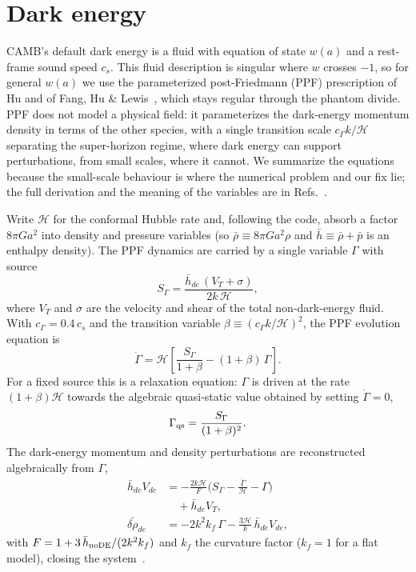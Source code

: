 \documentclass[prd, twocolumn, superscriptaddress, tightenlines, longbibliography, nofootinbib, eqsecnum, amsfonts, amsmath, floatfix, notitlepage]{revtex4-2}
\begin{document}
\section{Dark energy}
\label{sec:de}

\textsc{CAMB}'s default dark energy is a fluid with equation of state $w(a)$ and a
rest-frame sound speed $c_s$. This fluid description is singular where $w$ crosses
$-1$, so for general $w(a)$ we use the parameterized post-Friedmann (PPF)
prescription of Hu and of Fang, Hu \& Lewis~\cite{Hu:2008zd,Fang:2008sn}, which
stays regular through the phantom divide. PPF does not model a physical field: it
parameterizes the dark-energy momentum density in terms of the other species,
with a single transition scale $c_\Gamma k/\mathcal H$ separating the
super-horizon regime, where dark energy can support perturbations, from small
scales, where it cannot. We summarize the equations because the small-scale
behaviour is where the numerical problem and our fix lie; the full derivation and
the meaning of the variables are in Refs.~\cite{Hu:2008zd,Fang:2008sn}.

Write $\mathcal H$ for the conformal Hubble rate and, following the code, absorb a
factor $8\pi G a^2$ into density and pressure variables (so $\bar\rho\equiv8\pi G
a^2\rho$ and $\bar h\equiv\bar\rho+\bar p$ is an enthalpy density). The PPF
dynamics are carried by a single variable $\Gamma$ with source
\begin{equation}
  S_\Gamma=\frac{\bar h_{de}\,(V_T+\sigma)}{2 k\,\mathcal H},
  \label{eq:ppf-source}
\end{equation}
where $V_T$ and $\sigma$ are the velocity and shear of the total non-dark-energy
fluid. With $c_\Gamma=0.4\,c_s$ and the transition variable
$\beta\equiv(c_\Gamma k/\mathcal H)^2$, the PPF evolution equation is
\begin{equation}
  \dot\Gamma=\mathcal H\left[\frac{S_\Gamma}{1+\beta}-(1+\beta)\,\Gamma\right].
  \label{eq:ppf-gamma}
\end{equation}
For a fixed source this is a relaxation equation: $\Gamma$ is driven at the rate
$(1+\beta)\mathcal H$ towards the algebraic quasi-static value obtained by
setting $\dot\Gamma=0$,
\begin{equation}
  \Gamma_{\rm qs}=\frac{S_\Gamma}{(1+\beta)^2}.
  \label{eq:ppf-gamma-qs}
\end{equation}
The dark-energy momentum and density perturbations are reconstructed algebraically
from $\Gamma$,
\begin{align}
  \bar h_{de}V_{de}
  &=-\frac{2k\mathcal H}{F}\Big(S_\Gamma-\frac{\dot\Gamma}{\mathcal H}-\Gamma\Big)
  \nonumber\\
  &\quad{}+\bar h_{de}V_T,
  \nonumber\\
  \bar{\delta\rho}_{de}&=-2k^2 k_f\,\Gamma-\frac{3\mathcal H}{k}\,\bar h_{de}V_{de},
  \label{eq:ppf-close}
\end{align}
with $F=1+3\,\bar h_{\rm noDE}/(2k^2 k_f)$ and $k_f$ the curvature factor
($k_f=1$ for a flat model), closing the system~\cite{Hu:2008zd}.
\end{document}
